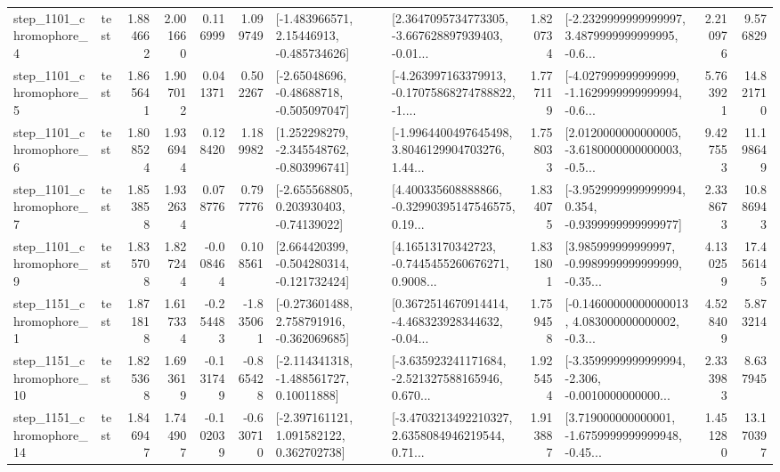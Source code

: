 \begin{tabular}{llrrrrllrlrr}
  step\_1101\_chromophore\_4 &      test &      1.884662 &    2.001660 &      0.116999 &  1.099749 &    [-1.483966571, 2.15446913, -0.485734626] &  [2.3647095734773305, -3.667628897939403, -0.01... &       1.820734 &  [-2.2329999999999997, 3.4879999999999995, -0.6... &            2.210976 &          9.576829 \\
  step\_1101\_chromophore\_5 &      test &      1.865641 &    1.907012 &      0.041371 &  0.502267 &    [-2.65048696, -0.48688718, -0.505097047] &  [-4.263997163379913, -0.17075868274788822, -1.... &       1.777119 &  [-4.027999999999999, -1.1629999999999994, -0.6... &            5.763921 &         14.821710 \\
  step\_1101\_chromophore\_6 &      test &      1.808524 &    1.936944 &      0.128420 &  1.189982 &   [1.252298279, -2.345548762, -0.803996741] &  [-1.9964400497645498, 3.8046129904703276, 1.44... &       1.758033 &  [2.0120000000000005, -3.6180000000000003, -0.5... &            9.427553 &         11.198649 \\
  step\_1101\_chromophore\_7 &      test &      1.853858 &    1.932634 &      0.078776 &  0.797776 &    [-2.655568805, 0.203930403, -0.74139022] &  [4.400335608888866, -0.32990395147546575, 0.19... &       1.834075 &  [-3.9529999999999994, 0.354, -0.9399999999999977] &            2.338673 &         10.886943 \\
  step\_1101\_chromophore\_9 &      test &      1.835708 &    1.827244 &     -0.008464 &  0.108561 &   [2.664420399, -0.504280314, -0.121732424] &  [4.16513170342723, -0.7445455260676271, 0.9008... &       1.831801 &  [3.985999999999997, -0.9989999999999999, -0.35... &            4.130259 &         17.456145 \\
  step\_1151\_chromophore\_1 &      test &      1.871818 &    1.617334 &     -0.254483 & -1.835061 &   [-0.273601488, 2.758791916, -0.362069685] &  [0.3672514670914414, -4.468323928344632, -0.04... &       1.759458 &  [-0.14600000000000013, 4.083000000000002, -0.3... &            4.528409 &          5.873214 \\
 step\_1151\_chromophore\_10 &      test &      1.825368 &    1.693619 &     -0.131749 & -0.865428 &    [-2.114341318, -1.488561727, 0.10011888] &  [-3.635923241171684, -2.521327588165946, 0.670... &       1.925454 &  [-3.3599999999999994, -2.306, -0.0010000000000... &            2.333983 &          8.637945 \\
 step\_1151\_chromophore\_14 &      test &      1.846947 &    1.744907 &     -0.102039 & -0.630710 &    [-2.397161121, 1.091582122, 0.362702738] &  [-3.4703213492210327, 2.6358084946219544, 0.71... &       1.913887 &  [3.719000000000001, -1.6759999999999948, -0.45... &            1.451280 &         13.170397 \\

\end{tabular}
